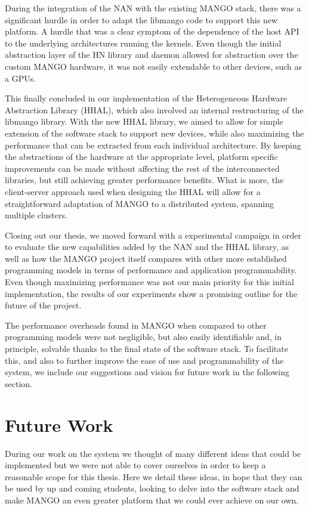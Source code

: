 During the integration of the NAN with the existing MANGO stack, there was a significant hurdle in order to adapt the libmango code to support this new platform. A hurdle that was a clear symptom of the dependence of the host API to the underlying architectures running the kernels. Even though the initial abstraction layer of the HN library and daemon allowed for abstraction over the custom MANGO hardware, it was not easily extendable to other devices, such as a GPUs.

This finally concluded in our implementation of the Heterogeneous Hardware Abstraction Library (HHAL), which also involved an internal restructuring of the libmango library. With the new HHAL library, we aimed to allow for simple extension of the software stack to support new devices, while also maximizing the performance that can be extracted from each individual architecture. By keeping the abstractions of the hardware at the appropriate level, platform specific improvements can be made without affecting the rest of the interconnected libraries, but still achieving greater performance benefits. What is more, the client-server approach used when designing the HHAL will allow for a straightforward adaptation of MANGO to a distributed system, spanning multiple clusters.

Closing out our thesis, we moved forward with a experimental campaign in order to evaluate the new capabilities added by the NAN and the HHAL library, as well as how the MANGO project itself compares with other more established programming models in terms of performance and application programmability. Even though maximizing performance was not our main priority for this initial implementation, the results of our experiments show a promising outline for the future of the project. 

The performance overheads found in MANGO when compared to other programming models were not negligible, but also easily identifiable and, in principle, solvable thanks to the final state of the software stack. To facilitate this, and also to further improve the ease of use and programmability of the system, we include our suggestions and vision for future work in the following section.

\section{Future Work} \label{sect:future-work}

During our work on the system we thought of many different ideas that could be implemented but we were not able to cover ourselves in order to keep a reasonable scope for this thesis. Here we detail these ideas, in hope that they can be used by up and coming students, looking to delve into the software stack and make MANGO an even greater platform that we could ever achieve on our own.

